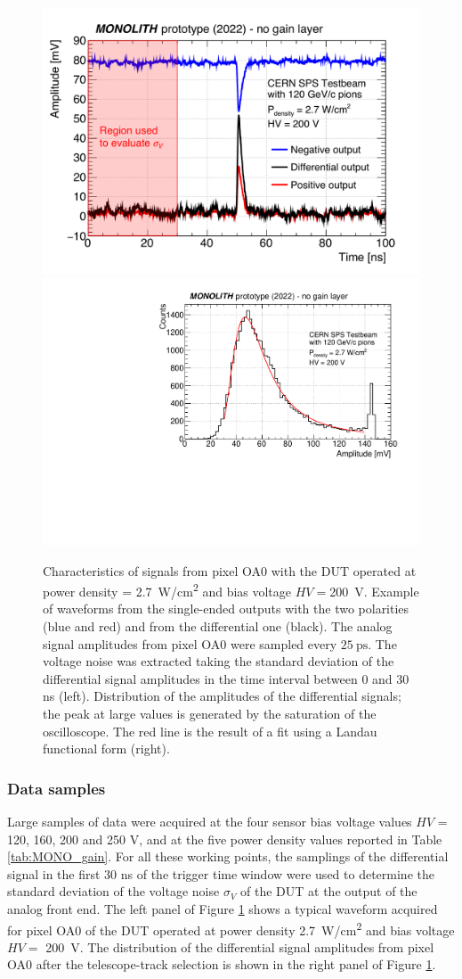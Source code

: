 		\begin{figure}[!htb]
			\centering
			\includegraphics[width=.49\textwidth]{files/MONOLITH_paper/waveform_with_bck_region.pdf}
			\includegraphics[width=.49\textwidth]{files/MONOLITH_paper/amplitude.pdf}
			\caption{Characteristics of signals from  pixel OA0 with the DUT operated at power density \power = \SI{2.7}{\watt/\centi\meter^2} and bias voltage $HV=$\SI{200}{\volt}. Example of waveforms from the single-ended outputs with the two polarities (blue and red) and from the differential one (black). The analog signal amplitudes from pixel OA0 were sampled every $\SI{25}{\pico\second}$.  The voltage noise \noise was extracted taking the standard deviation of the differential signal amplitudes in the time interval between 0 and 30 ns (left). Distribution of the amplitudes of the differential signals; the peak at large values is generated by the saturation of the oscilloscope. The red line is the result of a fit using a Landau functional form (right).}
			\label{im:MONO_waveform} 
		\end{figure}

		\subsubsection{Data samples}
		Large samples of data were acquired at the four sensor bias voltage values $HV$ = 120, 160, 200 and 250 V, and at the five power density values reported in Table \ref{tab:MONO_gain}.
		For all these working points, the samplings of the differential signal in the first 30 ns of the trigger time window were used to determine the standard deviation of the voltage noise $\sigma_V$ of the DUT at the output of the analog front end. The left panel of Figure \ref{im:MONO_waveform} shows a typical waveform acquired for pixel OA0 of the DUT operated at power density \power \SI{2.7}{\watt/\centi\meter^2} and bias voltage $HV=$ \SI{200}{\volt}.
		The distribution of the differential signal amplitudes from pixel OA0 after the telescope-track selection is shown in the right panel of Figure \ref{im:MONO_waveform}.

